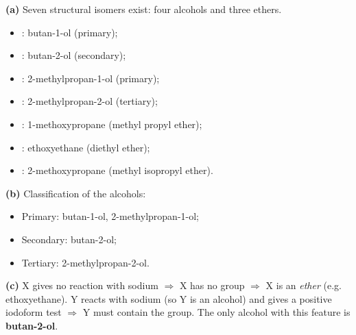 \documentclass[11pt]{article}
\begin{document}
\begin{corrige}
\textbf{(a)} Seven structural isomers exist: four alcohols and three ethers.
\begin{itemize}
\item {}: butan-1-ol (primary);
\item {}: butan-2-ol (secondary);
\item {}: 2-methylpropan-1-ol (primary);
\item {}: 2-methylpropan-2-ol (tertiary);
\item {}: 1-methoxypropane (methyl propyl ether);
\item {}: ethoxyethane (diethyl ether);
\item {}: 2-methoxypropane (methyl isopropyl ether).
\end{itemize}

\textbf{(b)} Classification of the alcohols:
\begin{itemize}
\item Primary: butan-1-ol, 2-methylpropan-1-ol;
\item Secondary: butan-2-ol;
\item Tertiary: 2-methylpropan-2-ol.
\end{itemize}

\textbf{(c)} X gives no reaction with sodium $\Rightarrow$ X has no  group $\Rightarrow$ X is an \emph{ether} (e.g. ethoxyethane). Y reacts with sodium (so Y is an alcohol) and gives a positive iodoform test $\Rightarrow$ Y must contain the  group. The only  alcohol with this feature is \textbf{butan-2-ol}.
\end{corrige}
\end{document}
